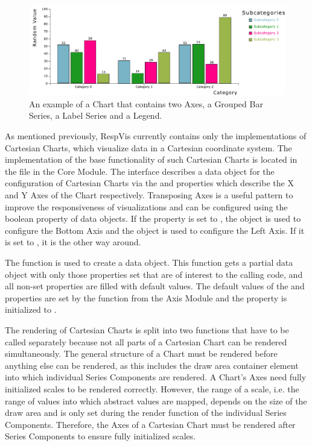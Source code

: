 \begin{figure}[tp]
\centering
\includegraphics[keepaspectratio,width=\linewidth,height=\fullh]
{diagrams/chart.pdf}
\caption[Chart Example]{%
An example of a Chart that contains two Axes, a Grouped Bar Series, a
Label Series and a Legend.  
}
\label{fig:Chart}
\end{figure}


As mentioned previously, RespVis currently contains only the
implementations of Cartesian Charts, which visualize data in a
Cartesian coordinate system.  The implementation of the base
functionality of such Cartesian Charts is located in the
 file in the Core Module.  The
 interface describes a data object for the
configuration of Cartesian Charts via the  and
  properties which describe the X and Y Axes of
the Chart respectively.  Transposing Axes is a useful pattern to
improve the responsiveness of visualizations and can be configured
using the  boolean property of 
data objects.  If the  property is set to ,
the  object is used to configure the Bottom Axis and the
 object is used to configure the Left Axis.  If it is set
to , it is the other way around.

The  function is used to create a
 data object.  This function gets a partial data
object with only those properties set that are of interest to the
calling code, and all non-set properties are filled with default
values.  The default values of the  and 
properties are set by the  function from the Axis
Module and the  property is initialized to .

The rendering of Cartesian Charts is split into two functions that
have to be called separately because not all parts of a Cartesian
Chart can be rendered simultaneously.  The general structure of a
Chart must be rendered before anything else can be rendered, as this
includes the draw area container element into which individual Series
Components are rendered.  A Chart's Axes need fully initialized scales
to be rendered correctly.  However, the range of a scale, i.e. the
range of values into which abstract values are mapped, depends on the
size of the draw area and is only set during the render function of
the individual Series Components.  Therefore, the Axes of a Cartesian
Chart must be rendered after Series Components to ensure fully
initialized scales.

